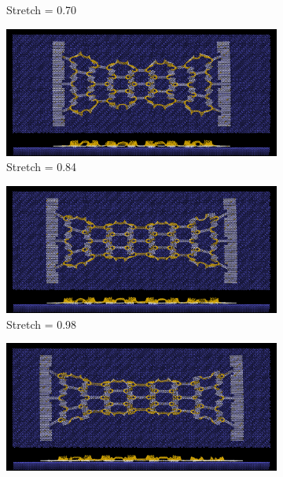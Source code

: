 \begin{figure}[H]
\begin{subfigure}[b]{0.49\textwidth}
        \caption{Stretch = 0.70}
        \label{fig:}
    \end{subfigure}
    \begin{subfigure}[b]{0.49\textwidth}
        \centering
        \includegraphics[width=\textwidth]{figures/baseline/contact_vs_stretch/honeycomb/hon_stretch0084.png}
        \caption{Stretch = 0.84}
        \label{fig:}
    \end{subfigure}
    \hfill
    \begin{subfigure}[b]{0.49\textwidth}
        \centering
        \includegraphics[width=\textwidth]{figures/baseline/contact_vs_stretch/honeycomb/hon_stretch0098.png}
        \caption{Stretch = 0.98}
        \label{fig:}
    \end{subfigure}
    \begin{subfigure}[b]{0.49\textwidth}
        \centering
        \includegraphics[width=\textwidth]{figures/baseline/contact_vs_stretch/honeycomb/hon_stretch0112.png}

\end{subfigure}
\end{figure}
